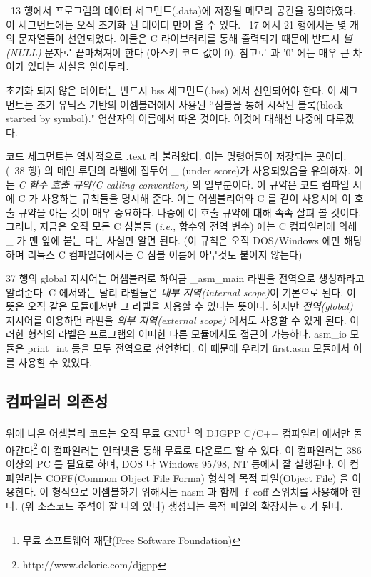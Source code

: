 ~13 행에서 프로그램의 데이터 세그먼트({\code .data})에 저장될 메모리 공간을 정의하였다. 이 세그먼트에는 오직 초기화 된 데이터 만이
올 수 있다. ~17 에서 21 행에서는 몇 개의 문자열들이 선언되었다. 이들은 C 라이브러리를 통해 출력되기 때문에 반드시 \emph{널(NULL)} 문자로 끝마쳐져야 한다
(아스키 코드 값이 0). 참고로 {} 과 {\code '0'} 에는 매우 큰 차이가 있다는 사실을 알아두라. 

초기화 되지 않은 데이터는 반드시 bss 세그먼트({\code .bss}) 에서 선언되어야 한다. 이 세그먼트는 초기 유닉스 기반의 어셈블러에서 사용된 ``심볼을 통해
시작된 블록(block started by symbol)." 연산자의 이름에서 따온 것이다. 이것에 대해선 나중에 다루겠다.  

코드 세그먼트는 역사적으로 {\code .text} 라 불려왔다. 이는 명령어들이 저장되는 곳이다. (~38 행) 의 메인 루틴의 라벨에 접두어 \_ (under
score)가 사용되었음을 유의하자. 이는 \emph{C 함수 호출 규약(C calling convention)}  의 일부분이다. 이 규약은 코드 컴파일 시에 C 가
사용하는 규칙들을 명시해 준다. 이는  어셈블리어와 C 를 같이 사용시에 이 호출 규약을 아는 것이 매우 중요하다. 나중에 이 호출 규약에 대해 속속 살펴 볼 것이다.
그러나, 지금은 오직 모든 C 심볼들 ({\em i.e.}, 함수와 전역 변수) 에는 C 컴파일러에 의해 \_ 가 맨 앞에 붙는 다는 사실만 알면 된다. (이 규칙은 오직 DOS/Windows
에만 해당하며 리눅스 C 컴파일러에서는 C 심볼 이름에 아무것도 붙이지 않는다) 

37 행의 {\code global}{} 지시어는 어셈블러로 하여금 {\code \_asm\_main} 라벨을 전역으로 생성하라고 알려준다. C 에서와는 달리 라벨들은
\emph{내부 지역(internal scope)}이 기본으로 된다. 이 뜻은 오직 같은 모듈에서만 그 라벨을 사용할 수 있다는 뜻이다. 하지만 \emph {전역(global)} 지시어를 이용하면 
라벨을 \emph {외부 지역(external scope)} 에서도 사용할 수 있게 된다. 이러한 형식의 라벨은 프로그램의 어떠한 다른 모듈에서도 접근이 가능하다. {\code asm\_io}
모듈은 {\code print\_int} 등을 모두 전역으로 선언한다. 이 때문에 우리가 {\code first.asm} 모듈에서 이를 사용할 수 있었다. 

\subsection{컴파일러 의존성}

위에 나온 어셈블리 코드는 오직 무료 GNU\footnote{무료 소프트웨어 재단(Free Software Foundation)} 의 DJGPP  C/C++ 컴파일러
에서만 돌아간다\footnote{\code http://www.delorie.com/djgpp} 이 컴파일러는 인터넷을 통해 무료로 다운로드 할 수 있다. 이 컴파일러는 386 이상의 
PC 를 필요로 하며, DOS 나 Windows 95/98, NT 등에서 잘 실행된다. 이 컴파일러는 COFF(Common Object File Forma) 형식의 목적 파일(Object File) 을 
이용한다. 이 형식으로 어셈블하기 위해서는 {\code nasm} 과 함께 {\code -f~coff} 스위치를 사용해야 한다. (위 소스코드 주석이 잘 나와 있다) 
생성되는 목적 파일의 확장자는 {\code o} 가 된다. 


